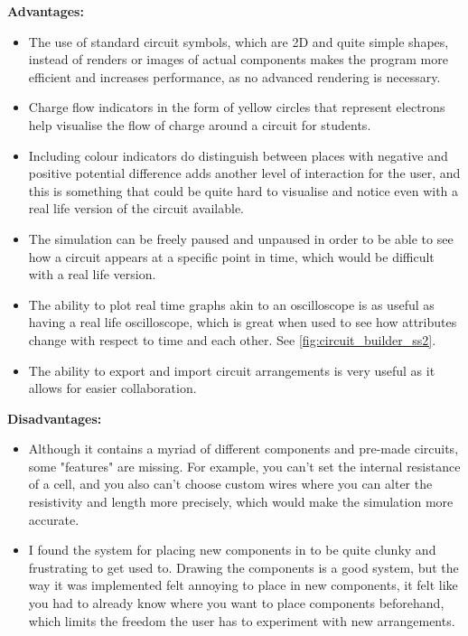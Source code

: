         \textbf{Advantages:}
        \begin{itemize}
            \item The use of standard circuit symbols, which are 2D and quite simple shapes, instead of renders or images of actual components makes the program more efficient and increases performance, as no advanced rendering is necessary. 
            \item Charge flow indicators in the form of yellow circles that represent electrons help visualise the flow of charge around a circuit for students. 
            \item Including colour indicators do distinguish between places with negative and positive potential difference adds another level of interaction for the user, and this is something that could be quite hard to visualise and notice even with a real life version of the circuit available.
            \item The simulation can be freely paused and unpaused in order to be able to see how a circuit appears at a specific point in time, which would be difficult with a real life version. 
            \item The ability to plot real time graphs akin to an oscilloscope is as useful as having a real life oscilloscope, which is great when used to see how attributes change with respect to time and each other. See \autoref{fig:circuit_builder_ss2}.
            \item The ability to export and import circuit arrangements is very useful as it allows for easier collaboration.
        \end{itemize}


        \textbf{Disadvantages:}
        \begin{itemize}
            \item Although it contains a myriad of different components and pre-made circuits, some "features" are missing. For example, you can't set the internal resistance of a cell, and you also can't choose custom wires where you can alter the resistivity and length more precisely, which would make the simulation more accurate.
            \item I found the system for placing new components in to be quite clunky and frustrating to get used to. Drawing the components is a good system, but the way it was implemented felt annoying to place in new components, it felt like you had to already know where you want to place components beforehand, which limits the freedom the user has to experiment with new arrangements. 
        \end{itemize}

